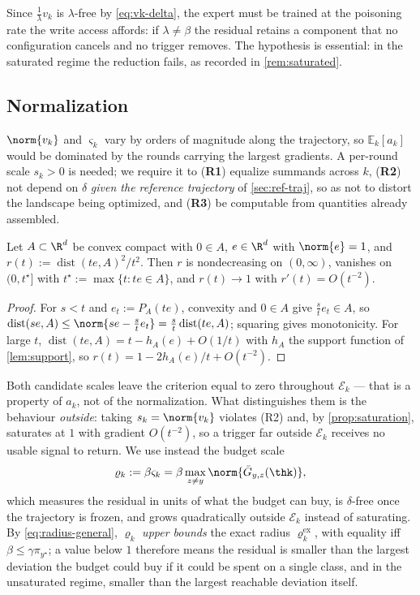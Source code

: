Since $\tfrac1\lambda v_k$ is $\lambda$-free by \cref{eq:vk-delta}, the expert must be trained at
the poisoning rate the write access affords: if $\lambda\neq\beta$ the residual retains a
component that no configuration cancels and no trigger removes. The hypothesis is essential: in
the saturated regime the reduction fails, as recorded in \cref{rem:saturated}.


\subsection{Normalization}
\label{sec:norm}

$\norm{v_k}$ and $\varsigma_k$ vary by orders of magnitude along the trajectory, so $\mathbb{E}_k[a_k]$ would be dominated by the rounds carrying the largest gradients. A per-round scale $s_k>0$ is needed; we require it to (\textbf{R1}) equalize summands across $k$, (\textbf{R2}) not depend on $\delta$ \emph{given the reference trajectory} of \cref{sec:ref-traj}, so as not to distort the landscape being optimized, and (\textbf{R3}) be computable from quantities already assembled.

\begin{proposition}
\label{prop:saturation}
Let $A\subset\R^d$ be convex compact with $0\in A$, $e\in\R^d$ with $\norm{e}=1$, and $r(t):=\operatorname{dist}(te,A)^2/t^2$. Then $r$ is nondecreasing on $(0,\infty)$, vanishes on $(0,t^\star]$ with $t^\star:=\max\{t:te\in A\}$, and $r(t)\to1$ with $r'(t)=O(t^{-2})$.
\end{proposition}
\begin{proof}
For $s<t$ and $e_t:=P_A(te)$, convexity and $0\in A$ give $\tfrac ste_t\in A$, so $\operatorname{dist}(se,A)\le\norm{se-\tfrac ste_t}=\tfrac st\operatorname{dist}(te,A)$; squaring gives monotonicity. For large $t$, $\operatorname{dist}(te,A)=t-h_A(e)+O(1/t)$ with $h_A$ the support function of \cref{lem:support}, so $r(t)=1-2h_A(e)/t+O(t^{-2})$.
\end{proof}

Both candidate scales leave the criterion equal to zero throughout $\mathcal{E}_k$ --- that is a
property of $a_k$, not of the normalization. What distinguishes them is the behaviour
\emph{outside}: taking $s_k=\norm{v_k}$ violates (R2) and, by \cref{prop:saturation}, saturates
at $1$ with gradient $O(t^{-2})$, so a trigger far outside $\mathcal{E}_k$ receives no usable
signal to return. We use instead the budget scale
\begin{equation}
\varrho_k:=\beta\varsigma_k=\beta\max_{z\neq y}\norm{\bar G_{y,z}(\thk)},
\label{eq:rho}
\end{equation}
which measures the residual in units of what the budget can buy, is $\delta$-free once the
trajectory is frozen, and grows quadratically outside $\mathcal{E}_k$ instead of saturating. By
\cref{eq:radius-general}, $\varrho_k$ \emph{upper bounds} the exact radius
$\varrho^{\mathrm{ex}}_k$, with equality iff $\beta\le\gamma\pi_{y^\star}$; a value below $1$
therefore means the residual is smaller than the largest deviation the budget could buy if it
could be spent on a single class, and in the unsaturated regime, smaller than the largest
reachable deviation itself.


